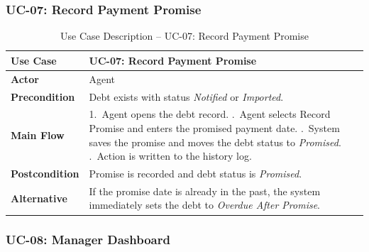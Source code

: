 \documentclass[12pt,a4paper]{report}
\begin{document}
\subsubsection{UC-07: Record Payment Promise}

\begin{table}[H]
  \centering
  \renewcommand{\arraystretch}{1.3}
  \begin{tabular}{|>{\bfseries}p{3.5cm}|p{10cm}|}
    \hline
    Use Case      & UC-07: Record Payment Promise \\
    \hline
    Actor         & Agent \\
    \hline
    Precondition  & Debt exists with status \textit{Notified} or \textit{Imported}. \\
    \hline
    Main Flow     & 1.\ Agent opens the debt record. \newline
                    2.\ Agent selects Record Promise and enters the promised payment
                        date. \newline
                    3.\ System saves the promise and moves the debt status to
                        \textit{Promised}. \newline
                    4.\ Action is written to the history log. \\
    \hline
    Postcondition & Promise is recorded and debt status is \textit{Promised}. \\
    \hline
    Alternative   & If the promise date is already in the past, the system
                    immediately sets the debt to \textit{Overdue After Promise}. \\
    \hline
  \end{tabular}
  \caption{Use Case Description -- UC-07: Record Payment Promise}
  \label{tab:uc07}
\end{table}

\subsubsection{UC-08: Manager Dashboard}
\end{document}
